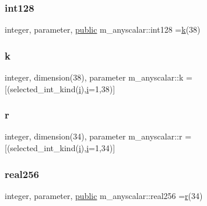 \subsubsection{\texorpdfstring{int128}{int128}}
{\footnotesize\ttfamily integer, parameter, \hyperlink{M__stopwatch_83_8txt_a2f74811300c361e53b430611a7d1769f}{public} m\+\_\+anyscalar\+::int128 =\hyperlink{namespacem__anyscalar_a099da1dd8639cdce3d0f5bb3cb8fbd03}{k}(38)}

\mbox{\label{namespacem__anyscalar_a099da1dd8639cdce3d0f5bb3cb8fbd03}} 
\subsubsection{\texorpdfstring{k}{k}}
{\footnotesize\ttfamily integer, dimension(38), parameter m\+\_\+anyscalar\+::k =\mbox{[}(selected\+\_\+int\+\_\+kind(\hyperlink{intro__blas1_83_8txt_a8ba82a50c0c2c12d5f6a77f7e4651c0b}{i}),\hyperlink{intro__blas1_83_8txt_a8ba82a50c0c2c12d5f6a77f7e4651c0b}{i}=1,38)\mbox{]}\hspace{0.3cm}{\ttfamily [private]}}

\mbox{\label{namespacem__anyscalar_af515907c09cc2ac286a4523cc73f5f52}} 
\subsubsection{\texorpdfstring{r}{r}}
{\footnotesize\ttfamily integer, dimension(34), parameter m\+\_\+anyscalar\+::r =\mbox{[}(selected\+\_\+int\+\_\+kind(\hyperlink{intro__blas1_83_8txt_a8ba82a50c0c2c12d5f6a77f7e4651c0b}{i}),\hyperlink{intro__blas1_83_8txt_a8ba82a50c0c2c12d5f6a77f7e4651c0b}{i}=1,34)\mbox{]}\hspace{0.3cm}{\ttfamily [private]}}

\mbox{\label{namespacem__anyscalar_a6d3ef2bc1698c91d737dbd8824a9eb0b}} 
\subsubsection{\texorpdfstring{real256}{real256}}
{\footnotesize\ttfamily integer, parameter, \hyperlink{M__stopwatch_83_8txt_a2f74811300c361e53b430611a7d1769f}{public} m\+\_\+anyscalar\+::real256 =\hyperlink{namespacem__anyscalar_af515907c09cc2ac286a4523cc73f5f52}{r}(34)}

